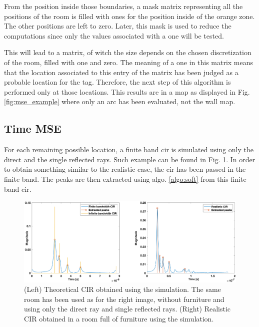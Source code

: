 From the position inside those boundaries, a mask matrix representing all the positions of the room is filled with ones for the position inside of the orange zone. The other positions are left to zero. Later, this mask is used to reduce the computations since only the values associated with a one will be tested.
\vspace{2mm}

This will lead to a matrix, of witch the size depends on the chosen discretization of the room, filled with one and zero. The meaning of a one in this matrix means that the location associated to this entry of the matrix has been judged as a probable location for the tag. Therefore, the next step of this algorithm is performed only at those locations. This results are in a map as displayed in Fig. \ref{fig:mse_example} where only an arc has been evaluated, not the wall map.

\subsection{Time MSE}

For each remaining possible location, a finite band \gls{cir} is simulated using only the direct and the single reflected rays. Such example can be found in Fig. \ref{fig:soft_simu}. In order to obtain something similar to the realistic case, the \gls{cir} has been passed in the finite band. The peaks are then extracted using algo. \ref{algo:soft} from this finite band \gls{cir}.

\begin{figure}[H]
\centering
\includegraphics[width=\linewidth]{Images/inf_vs_fin.png}
\caption{(Left) Theoretical CIR obtained using the simulation. The same room has been used as for the right image, without furniture and using only the direct ray and single reflected rays.  (Right) Realistic CIR obtained in a room full of furniture using the simulation.\label{fig:soft_simu}}
\end{figure}

